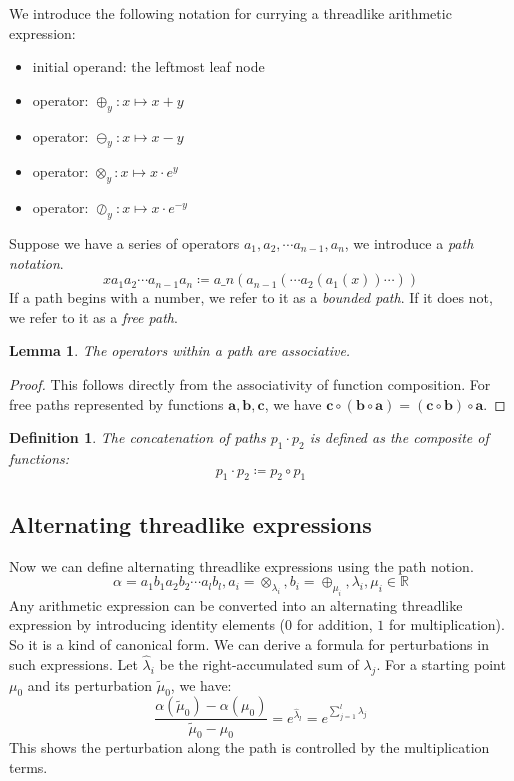 \documentclass[12pt]{article}
\newtheorem{definition}{Definition}[section]
\newtheorem{lemma}{Lemma}[section]
\begin{document}
We introduce the following notation for currying a threadlike arithmetic expression:
\begin{itemize}
    \item initial operand: the leftmost leaf node
    \item operator: $\oplus_y: x \mapsto x + y$
    \item operator: $\ominus_y: x \mapsto x - y$
    \item operator: $\otimes_y: x \mapsto x \cdot e^y$
    \item operator: $\oslash_y: x \mapsto x \cdot e^{-y}$
\end{itemize}

Suppose we have a series of operators $a_1, a_2, \cdots a_{n-1}, a_n$, we introduce a \emph{path notation}.
\[x a_1 a_2 \cdots a_{n-1} a_n \coloneqq a\_n( a_{n-1}( \cdots a_2( a_1(x) ) \cdots ) )\]
If a path begins with a number, we refer to it as a \emph{bounded path}.
If it does not, we refer to it as a \emph{free path}.

\begin{lemma}\label{lemma:associative-full}
    The operators within a path are associative.
\end{lemma}
\begin{proof}
This follows directly from the associativity of function composition. For free paths represented by functions $\mathbf{a}, \mathbf{b}, \mathbf{c}$, we have $\mathbf{c} \circ (\mathbf{b} \circ \mathbf{a}) = (\mathbf{c} \circ \mathbf{b}) \circ \mathbf{a}$.
\end{proof}

\begin{definition}\label{definition:concatenate-full}
    The concatenation of paths $p_1 \cdot p_2$ is defined as the composite of functions:
    \[p_1 \cdot p_2 \coloneqq p_2 \circ p_1 \]
\end{definition}

\subsection{Alternating threadlike expressions}\label{subsec:alternating-full}
Now we can define alternating threadlike expressions using the path notion.
\begin{equation}\label{eq:alternative-full}
    \alpha = a_1 b_1 a_2 b_2 \cdots a_l b_l, a_i = \otimes_{\lambda_i}, b_i = \oplus_{\mu_i}, \lambda_i, \mu_i \in \mathbb{R}
\end{equation}
Any arithmetic expression can be converted into an alternating threadlike expression by introducing identity elements ($0$ for addition, $1$ for multiplication). So it is a kind of canonical form. We can derive a formula for perturbations in such expressions. Let $\hat{\lambda}_i$ be the right-accumulated sum of $\lambda_j$. For a starting point $\mu_0$ and its perturbation $\tilde{\mu}_0$, we have:
\begin{equation}
\frac{\alpha(\tilde{\mu}_0) - \alpha(\mu_0)}{\tilde{\mu}_0 - \mu_0} = e^{\hat{\lambda}_l} = e^{\sum_{j=1}^l \lambda_j}\label{eq:ratio-full}
\end{equation}
This shows the perturbation along the path is controlled by the multiplication terms.
\end{document}
